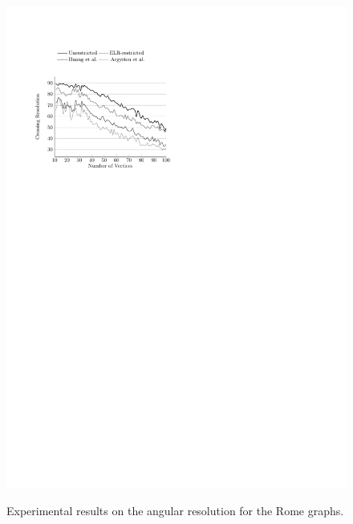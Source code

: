 \documentclass{comjnl}
\begin{document}
\begin{figure}[t]
{	\includegraphics[scale=0.99,page=12]{figures/rome}}
	\caption{Experimental results on the angular resolution for the Rome graphs.}
	\label{fig:an-res}
\end{figure}
\end{document}
